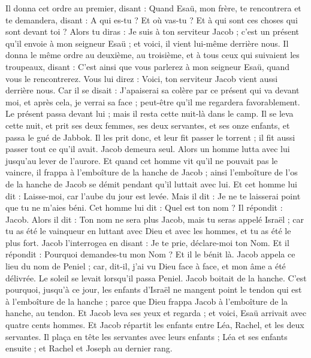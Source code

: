 \begin{multicols}{2}
Il donna cet ordre au premier, disant : Quand Esaü, mon frère, te rencontrera et te demandera, disant : A qui es-tu ? Et où vas-tu ? Et à qui sont ces choses qui sont devant toi ?
Alors tu diras : Je suis à ton serviteur Jacob ; c'est un présent qu'il envoie à mon seigneur Esaü ; et voici, il vient lui-même derrière nous.
Il donna le même ordre au deuxième, au troisième, et à tous ceux qui suivaient les troupeaux, disant : C'est ainsi que vous parlerez à mon seigneur Esaü, quand vous le rencontrerez.
Vous lui direz : Voici, ton serviteur Jacob vient aussi derrière nous. Car il se disait : J'apaiserai sa colère par ce présent qui va devant moi, et après cela, je verrai sa face ; peut-être qu'il me regardera favorablement.
Le présent passa devant lui ; mais il resta cette nuit-là dans le camp.
Il se leva cette nuit, et prit ses deux femmes, ses deux servantes, et ses onze enfants, et passa le gué de Jabbok.
Il les prit donc, et leur fit passer le torrent ; il fit aussi passer tout ce qu'il avait.
Jacob demeura seul. Alors un homme lutta avec lui jusqu'au lever de l'aurore.
Et quand cet homme vit qu'il ne pouvait pas le vaincre, il frappa à l'emboîture de la hanche de Jacob ; ainsi l'emboîture de l'os de la hanche de Jacob se démit pendant qu'il luttait avec lui.
Et cet homme lui dit : Laisse-moi, car l'aube du jour est levée. Mais il dit : Je ne te laisserai point que tu ne m'aies béni.
Cet homme lui dit : Quel est ton nom ? Il répondit : Jacob.
Alors il dit : Ton nom ne sera plus Jacob, mais tu seras appelé Israël ; car tu as été le vainqueur en luttant avec Dieu et avec les hommes, et tu as été le plus fort.
Jacob l'interrogea en disant : Je te prie, déclare-moi ton Nom. Et il répondit : Pourquoi demandes-tu mon Nom ? Et il le bénit là.
Jacob appela ce lieu du nom de Peniel ; car, dit-il, j'ai vu Dieu face à face, et mon âme a été délivrée.
Le soleil se levait lorsqu'il passa Peniel. Jacob boitait de la hanche.
C'est pourquoi, jusqu'à ce jour, les enfants d'Israël ne mangent point le tendon qui est à l'emboîture de la hanche ; parce que Dieu frappa Jacob à l'emboîture de la hanche, au tendon.
\VerseOne{}Et Jacob leva ses yeux et regarda ; et voici, Esaü arrivait avec quatre cents hommes. Et Jacob répartit les enfants entre Léa, Rachel, et les deux servantes.
Il plaça en tête les servantes avec leurs enfants ; Léa et ses enfants ensuite ; et Rachel et Joseph au dernier rang.

\end{multicols}
